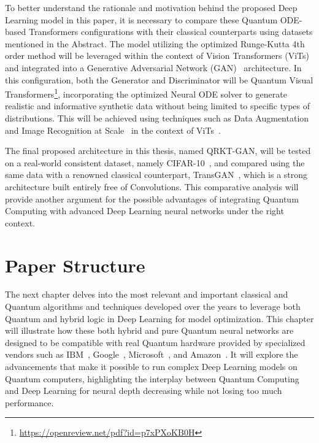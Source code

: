 \documentclass[12pt,a4paper]{report}
\begin{document}
To better understand the rationale and motivation behind the proposed Deep Learning model in this paper, it is necessary to compare these Quantum ODE-based Transformers configurations  with their classical counterparts using datasets mentioned in the Abstract. The model utilizing the optimized Runge-Kutta 4th order method will be leveraged within the context of Vision Transformers (ViTs)~\cite{vaswani2017attention} and integrated into a Generative Adversarial Network (GAN)~\cite{goodfellow2014generative} architecture. In this configuration, both the Generator and Discriminator will be Quantum Visual Transformers\footnote{\url{https://openreview.net/pdf?id=p7xPXoKB0H}}, incorporating the optimized Neural ODE solver to generate realistic and informative synthetic data without being limited to specific types of distributions. This will be achieved using techniques such as Data Augmentation~\cite{zhao2020diffaugment} and Image Recognition at Scale~\cite{dosovitskiy2020} in the context of ViTs~\cite{vaswani2017attention}.

The final proposed architecture in this thesis, named QRKT-GAN, will be tested on a real-world consistent dataset, namely CIFAR-10~\cite{Krizhevsky09learningmultiple}, and compared using the same data with a renowned classical counterpart, TransGAN~\cite{jiang2021transgan}, which is a strong architecture built entirely free of Convolutions. This comparative analysis will provide another argument for the possible advantages of integrating Quantum Computing with advanced Deep Learning neural networks under the right context.
\section{Paper Structure}\vspace{-12pt}
The next chapter delves into the most relevant and important classical and Quantum algorithms and techniques developed over the years to leverage both Quantum and hybrid logic in Deep Learning for model optimization. This chapter will illustrate how these both hybrid and pure Quantum neural networks are designed to be compatible with real Quantum hardware provided by specialized vendors such as IBM~\cite{Santos_2016}, Google~\cite{kalai2023googles}, Microsoft~\cite{Mykhailova_2023}, and Amazon~\cite{Reyes_2021}. It will explore the advancements that make it possible to run complex Deep Learning models on Quantum computers, highlighting the interplay between Quantum Computing and Deep Learning for neural depth decreasing while not losing too much performance.
\end{document}

